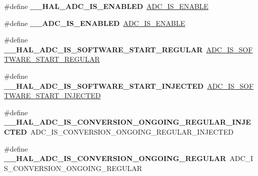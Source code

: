 \begin{DoxyCompactItemize}
\#define {\bfseries \+\_\+\+\_\+\+H\+A\+L\+\_\+\+A\+D\+C\+\_\+\+I\+S\+\_\+\+E\+N\+A\+B\+L\+ED}~\hyperlink{group___a_d_c___private___macros_gafe3a7a04ff078c62ae98b19403f696c7}{A\+D\+C\+\_\+\+I\+S\+\_\+\+E\+N\+A\+B\+LE}
\item 
\mbox{\label{group___h_a_l___a_d_c___aliased___macros_ga32e5ccb7060b98a06749eb20d922d51b}} 
\#define {\bfseries \+\_\+\+\_\+\+A\+D\+C\+\_\+\+I\+S\+\_\+\+E\+N\+A\+B\+L\+ED}~\hyperlink{group___a_d_c___private___macros_gafe3a7a04ff078c62ae98b19403f696c7}{A\+D\+C\+\_\+\+I\+S\+\_\+\+E\+N\+A\+B\+LE}
\item 
\mbox{\label{group___h_a_l___a_d_c___aliased___macros_gad995b81efb72f4fe37152863d465bace}} 
\#define {\bfseries \+\_\+\+\_\+\+H\+A\+L\+\_\+\+A\+D\+C\+\_\+\+I\+S\+\_\+\+S\+O\+F\+T\+W\+A\+R\+E\+\_\+\+S\+T\+A\+R\+T\+\_\+\+R\+E\+G\+U\+L\+AR}~\hyperlink{group___a_d_c___private___macros_ga2ccb82ecf85d6c6d1ff2cdf9b6a82d2b}{A\+D\+C\+\_\+\+I\+S\+\_\+\+S\+O\+F\+T\+W\+A\+R\+E\+\_\+\+S\+T\+A\+R\+T\+\_\+\+R\+E\+G\+U\+L\+AR}
\item 
\mbox{\label{group___h_a_l___a_d_c___aliased___macros_ga5fa40578941f107c4ae1308e14266f7d}} 
\#define {\bfseries \+\_\+\+\_\+\+H\+A\+L\+\_\+\+A\+D\+C\+\_\+\+I\+S\+\_\+\+S\+O\+F\+T\+W\+A\+R\+E\+\_\+\+S\+T\+A\+R\+T\+\_\+\+I\+N\+J\+E\+C\+T\+ED}~\hyperlink{group___a_d_c___private___macros_gaa3a1c2197a097b9bb8159b6eb1ac8941}{A\+D\+C\+\_\+\+I\+S\+\_\+\+S\+O\+F\+T\+W\+A\+R\+E\+\_\+\+S\+T\+A\+R\+T\+\_\+\+I\+N\+J\+E\+C\+T\+ED}
\item 
\mbox{\label{group___h_a_l___a_d_c___aliased___macros_ga573771917c650599112d38dc260f785b}} 
\#define {\bfseries \+\_\+\+\_\+\+H\+A\+L\+\_\+\+A\+D\+C\+\_\+\+I\+S\+\_\+\+C\+O\+N\+V\+E\+R\+S\+I\+O\+N\+\_\+\+O\+N\+G\+O\+I\+N\+G\+\_\+\+R\+E\+G\+U\+L\+A\+R\+\_\+\+I\+N\+J\+E\+C\+T\+ED}~A\+D\+C\+\_\+\+I\+S\+\_\+\+C\+O\+N\+V\+E\+R\+S\+I\+O\+N\+\_\+\+O\+N\+G\+O\+I\+N\+G\+\_\+\+R\+E\+G\+U\+L\+A\+R\+\_\+\+I\+N\+J\+E\+C\+T\+ED
\item 
\mbox{\label{group___h_a_l___a_d_c___aliased___macros_gaf6d1e4fb1fd1bca13b6c22953e805698}} 
\#define {\bfseries \+\_\+\+\_\+\+H\+A\+L\+\_\+\+A\+D\+C\+\_\+\+I\+S\+\_\+\+C\+O\+N\+V\+E\+R\+S\+I\+O\+N\+\_\+\+O\+N\+G\+O\+I\+N\+G\+\_\+\+R\+E\+G\+U\+L\+AR}~A\+D\+C\+\_\+\+I\+S\+\_\+\+C\+O\+N\+V\+E\+R\+S\+I\+O\+N\+\_\+\+O\+N\+G\+O\+I\+N\+G\+\_\+\+R\+E\+G\+U\+L\+AR

\end{DoxyCompactItemize}
